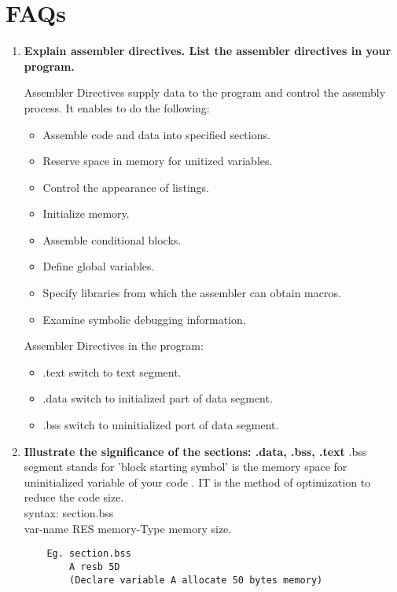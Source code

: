 \documentclass[11pt]{article}
\begin{document}
\section{\textbf{FAQs}}
\begin{enumerate}
	\item {\textbf{Explain assembler directives. List the assembler directives in your program.}}
	
	Assembler Directives supply data to the program and control the assembly process. It enables to do the following:
\begin{itemize}
    \item Assemble code and data into specified sections. 
    \item Reserve space in memory for unitized variables.
    \item Control the appearance of listings.
    \item Initialize memory.
    \item Assemble conditional blocks.
    \item Define global variables.
    \item Specify libraries from which the assembler can obtain macros.
    \item Examine symbolic debugging information.
\end{itemize}

Assembler Directives in the program:
\begin{itemize}
    \item .text      switch to text segment.
    \item .data      switch to initialized part of data segment.
    \item .bss       switch to uninitialized port of data segment.
\end{itemize}

\item {\textbf{Illustrate the significance of the sections: .data, .bss, .text}}
.bss segment stands for 'block starting symbol' is the memory space for uninitialized variable of your code . IT is the method of optimization to reduce the code size.\\
syntax: section.bss\\
\indent var-name RES memory-Type memory size.\\
\begin{verbatim}
    Eg. section.bss
        A resb 5D
        (Declare variable A allocate 50 bytes memory)
\end{verbatim}


\end{enumerate}
\end{document}

